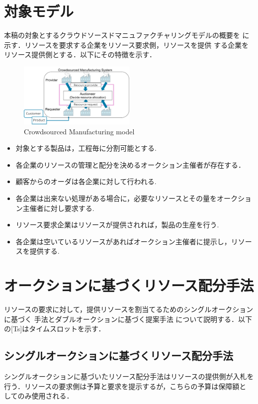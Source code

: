 \documentclass{ujarticle}
\begin{document}
\section{対象モデル}
本稿の対象とするクラウドソースドマニュファクチャリングモデルの概要を
に示す．リソースを要求する企業をリソース要求側，リソースを提供
する企業をリソース提供側とする．以下にその特徴を示す．
\begin{figure}[H]
  \centering
  \includegraphics[width=0.5\textwidth]{CsMfg.pdf} 
  \caption{Crowdsourced Manufacturing model}
  \label{fig:CsMfg}
\end{figure}
\begin{itemize}
  \item {対象とする製品は，工程毎に分割可能とする.}
  \item {各企業のリソースの管理と配分を決めるオークション主催者が存在する．}
  \item {顧客からのオーダは各企業に対して行われる.}
  \item {各企業は出来ない処理がある場合に，必要なリソースとその量をオークショ
      ン主催者に対し要求する.} 
  \item {リソース要求企業はリソースが提供されれば，製品の生産を行う.}
  \item {各企業は空いているリソースがあればオークション主催者に提示し，リソースを提供する.}
\end{itemize}
\section{オークションに基づくリソース配分手法}
リソースの要求に対して，提供リソースを割当てるためのシングルオークションに基づく
手法とダブルオークションに基づく提案手法
について説明する．以下の[Ts]はタイムスロットを示す．
\subsection{シングルオークションに基づくリソース配分手法}
シングルオークションに基づいたリソース配分手法はリソースの提供側が入札を行う．リソースの要求側は予算と要求を提示するが，こちらの予算は保障額と
してのみ使用される．
\end{document}
